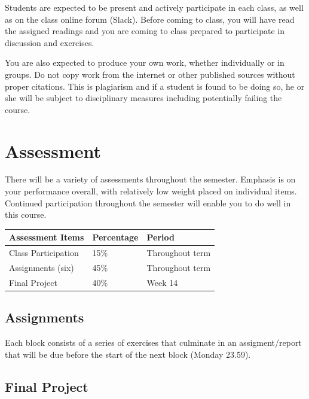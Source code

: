\documentclass[]{book}
\begin{document}
Students are expected to be present and actively participate in each class, as well as on the class online forum (Slack). Before coming to class, you will have read the assigned readings and you are coming to class prepared to participate in discussion and exercises.

You are also expected to produce your own work, whether individually or in groups. Do not copy work from the internet or other published sources without proper citations. This is plagiarism and if a student is found to be doing so, he or she will be subject to disciplinary measures including potentially failing the course.

\hypertarget{assessment}{%
\section{Assessment}\label{assessment}}

There will be a variety of assessments throughout the semester. Emphasis is on your performance overall, with relatively low weight placed on individual items. Continued participation throughout the semester will enable you to do well in this course.

\begin{longtable}[]{@{}lll@{}}
\toprule
Assessment Items & Percentage & Period\tabularnewline
\midrule
\endhead
Class Participation & 15\% & Throughout term\tabularnewline
Assignments (six) & 45\% & Throughout term\tabularnewline
Final Project & 40\% & Week 14\tabularnewline
\bottomrule
\end{longtable}

\hypertarget{assignments}{%
\subsection{Assignments}\label{assignments}}

Each block consists of a series of exercises that culminate in an assigment/report that will be due before the start of the next block (Monday 23.59).

\hypertarget{final-project}{%
\subsection{Final Project}\label{final-project}}
\end{document}
